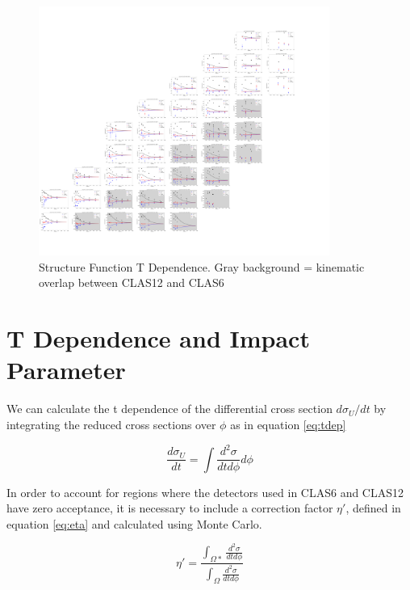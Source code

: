     \begin{figure}[ht]
        \centering
        \includegraphics[trim={0 15cm 18cm 13cm},clip,angle=90,origin=c,width=0.85\textwidth]{Chapters/Ch5-Further/GK_model/pics/combined_t_nofold.png}
        \caption[T Dependence]{Structure Function T Dependence. Gray background = kinematic overlap between CLAS12 and CLAS6}
        \label{fig:t_dependence}
    \end{figure}

\clearpage
\section{T Dependence and Impact Parameter}
    
    We can calculate the t dependence of the differential cross section $d\sigma_U/dt$ by integrating the reduced cross sections over $\phi$ as in equation \ref{eq:tdep}
    
     \begin{equation}\label{eq:tdep}
        \frac{d\sigma_U}{dt} = \int \frac{d^2\sigma}{dtd\phi} d\phi
    \end{equation}
    
    In order to account for regions where the detectors used in CLAS6 and CLAS12 have zero acceptance, it is necessary to include a correction factor $\eta'$, defined in equation \ref{eq:eta} and calculated using Monte Carlo. 
    
     \begin{equation}\label{eq:eta}
        \eta' = \frac{\int_{\Omega*} \frac{d^2\sigma}{dtd\phi} }{\int_{\Omega} \frac{d^2\sigma}{dtd\phi}}
    \end{equation}
    
